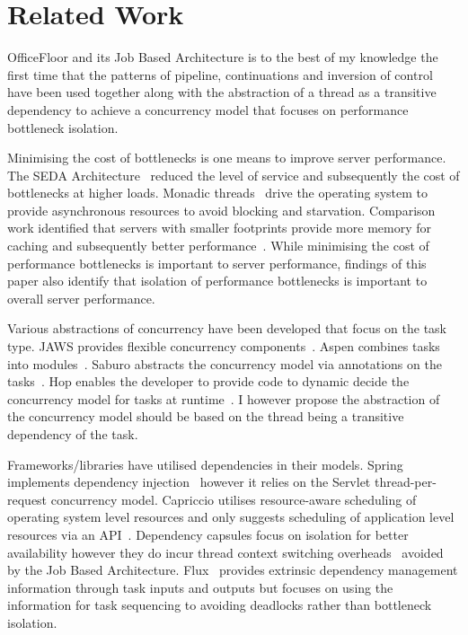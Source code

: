\documentclass[conference]{ieee/IEEEtran}
\begin{document}
\section{Related Work}
OfficeFloor and its Job Based Architecture is to the best of my knowledge the
first time that the patterns of pipeline, continuations and inversion of control
have been used together along with the abstraction of a thread as a transitive
dependency to achieve a concurrency model that focuses on performance bottleneck
isolation.

Minimising the cost of bottlenecks is one means to improve server performance.
The SEDA Architecture~\cite{seda} reduced the level of service and subsequently
the cost of bottlenecks at higher loads.  Monadic threads~\cite{monadic-thread}
drive the operating system to provide asynchronous resources to avoid blocking
and starvation.  Comparison work identified that servers with smaller footprints
provide more memory for caching and subsequently better
performance~\cite{low-server-footprint}.  While minimising the cost of
performance bottlenecks is important to server performance, findings of this
paper also identify that isolation of performance bottlenecks is important to
overall server performance.

Various abstractions of concurrency have been developed that focus on the task
type.  JAWS provides flexible concurrency components~\cite{jaws}.  Aspen
combines tasks into modules~\cite{aspen}.  Saburo abstracts the concurrency
model via annotations on the tasks~\cite{saburo}.  Hop enables the developer to
provide code to dynamic decide the concurrency model for tasks at
runtime~\cite{hop}.  I however propose the abstraction of the concurrency model
should be based on the thread being a transitive dependency of the task.

Frameworks/libraries have utilised dependencies in their models.  Spring
implements dependency injection~\cite{ioc} however it relies on the Servlet
thread-per-request concurrency model.  Capriccio utilises resource-aware
scheduling of operating system level resources and only suggests scheduling of
application level resources via an API~\cite{capriccio}.  Dependency capsules
focus on isolation for better availability however they do incur thread context
switching overheads~\cite{dependency-capsules} avoided by the Job Based
Architecture.  Flux~\cite{flux} provides extrinsic dependency management
information through task inputs and outputs but focuses on using the information
for task sequencing to avoiding deadlocks rather than bottleneck isolation.
\end{document}
